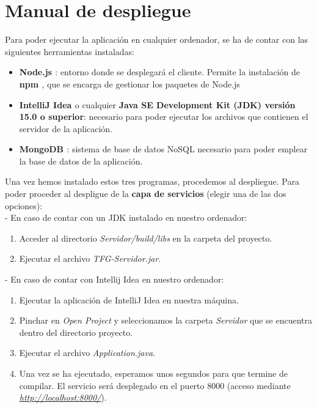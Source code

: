 \section{Manual de despliegue}

Para poder ejecutar la aplicación en cualquier ordenador, se ha de contar con las siguientes herramientas instaladas:
\begin{itemize}
\item {\bf Node.js \cite{nodejs}}: entorno donde se desplegará el cliente. Permite la instalación de {\bf npm \cite{npm}}, que se encarga de gestionar los paquetes de Node.js
\item {\bf IntelliJ Idea \cite{intellij}} o cualquier {\bf Java SE Development Kit (JDK) \cite{jdk} versión 15.0 o superior}: necesario para poder ejecutar los archivos que contienen el servidor de la aplicación.
\item {\bf MongoDB \cite{mongodb}}: sistema de base de datos NoSQL necesario para poder emplear la base de datos de la aplicación.
\end{itemize}

Una vez hemos instalado estos tres programas, procedemos al despliegue. Para poder proceder al despligue de la {\bf capa de servicios} (elegir una de las dos opciones):
\\

- En caso de contar con un JDK instalado en nuestro ordenador:
\begin{enumerate}
\item Acceder al directorio {\it Servidor/build/libs} en la carpeta del proyecto.
\item Ejecutar el archivo {\it TFG-Servidor.jar}.
\end{enumerate}

- En caso de contar con Intellij Idea en nuestro ordenador:
\begin{enumerate}
\item Ejecutar la aplicación de IntelliJ Idea en nuestra máquina.
\item Pinchar en {\it Open Project} y seleccionamos la carpeta {\it Servidor} que se encuentra dentro del directorio proyecto.
\item Ejecutar el archivo {\it Application.java}.
\item Una vez se ha ejecutado, esperamos unos segundos para que termine de compilar. El servicio será desplegado en el puerto 8000 (acceso mediante {\it \url{http://localhost:8000/}}).
\end{enumerate}

